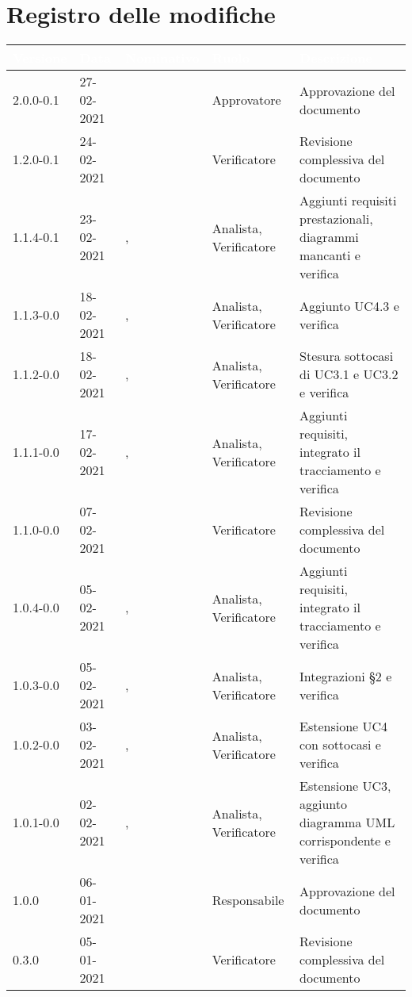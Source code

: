 \section*{Registro delle modifiche}
{
\setcounter{table}{-1}
{
\setlength\arrayrulewidth{1pt}
\renewcommand{\arraystretch}{1.5}
\centering
\begin{longtable}{C{1.7cm} | C{2.5cm} | C{3.2cm} | C{2.7cm}  | C{4.8cm}}
\textcolor{white}{\textbf{Versione}}&
\textcolor{white}{\textbf{Data}}&
\textcolor{white}{\textbf{Nominativo}}&
\textcolor{white}{\textbf{Ruolo}}&
\textcolor{white}{\textbf{Descrizione}}\\	
\endhead

2.0.0-0.1 & 27-02-2021 & \ZM{} & Approvatore & Approvazione del documento\\
1.2.0-0.1 & 24-02-2021 & \SH{} & Verificatore & Revisione complessiva del documento\\
1.1.4-0.1 & 23-02-2021 & \RA{}, \SG{} & Analista, Verificatore & Aggiunti requisiti prestazionali, diagrammi mancanti e verifica\\
1.1.3-0.0 & 18-02-2021 & \PA{}, \SG{} & Analista, Verificatore & Aggiunto UC4.3 e verifica\\
1.1.2-0.0 & 18-02-2021 & \RA{}, \SG{} & Analista, Verificatore & Stesura sottocasi di UC3.1 e UC3.2 e verifica\\
1.1.1-0.0 & 17-02-2021 & \PA{}, \BM{} & Analista, Verificatore & Aggiunti requisiti, integrato il tracciamento e verifica\\
1.1.0-0.0 & 07-02-2021 & \SH{} & Verificatore & Revisione complessiva del documento\\
1.0.4-0.0 & 05-02-2021 & \PA{}, \BM{} & Analista, Verificatore & Aggiunti requisiti, integrato il tracciamento e verifica\\
1.0.3-0.0 & 05-02-2021 & \PA{}, \BM{} & Analista, Verificatore & Integrazioni  \S2 e verifica\\
1.0.2-0.0 & 03-02-2021 & \ZM{}, \SH{} & Analista, Verificatore & Estensione UC4 con sottocasi e verifica\\
1.0.1-0.0 & 02-02-2021 & \ZM{}, \SH{} & Analista, Verificatore & Estensione UC3, aggiunto diagramma UML corrispondente  e verifica\\
1.0.0 & 06-01-2021 & \BM{} & Responsabile & Approvazione del documento \\

0.3.0 & 05-01-2021 & \PA{} & Verificatore & Revisione complessiva del documento \\


\end{longtable}}}
